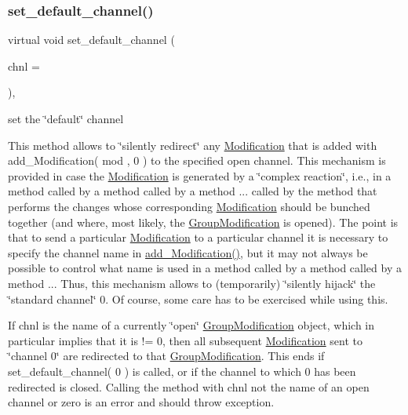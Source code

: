 \subsubsection{\texorpdfstring{set\+\_\+default\+\_\+channel()}{set\_default\_channel()}}
{\footnotesize\ttfamily virtual void set\+\_\+default\+\_\+channel (\begin{DoxyParamCaption}\item[{\mbox{\hyperlink{class_s_m_spp__di__unipi__it_1_1_observer_aa9ad8de42ffaf90023bfed5c085ad8bc}{c\+\_\+\+Chnl\+Name}}}]{chnl = {} }\end{DoxyParamCaption})\hspace{0.3cm}{\ttfamily [override]}, {\ttfamily [virtual]}}



set the \char`\"{}default\char`\"{} channel 

This method allows to \char`\"{}silently redirect\char`\"{} any \mbox{\hyperlink{class_s_m_spp__di__unipi__it_1_1_modification}{Modification}} that is added with add\+\_\+\+Modification( mod , 0 ) to the specified open channel. This mechanism is provided in case the \mbox{\hyperlink{class_s_m_spp__di__unipi__it_1_1_modification}{Modification}} is generated by a \char`\"{}complex reaction\char`\"{}, i.\+e., in a method called by a method called by a method ... called by the method that performs the changes whose corresponding \mbox{\hyperlink{class_s_m_spp__di__unipi__it_1_1_modification}{Modification}} should be bunched together (and where, most likely, the \mbox{\hyperlink{class_s_m_spp__di__unipi__it_1_1_group_modification}{Group\+Modification}} is opened). The point is that to send a particular \mbox{\hyperlink{class_s_m_spp__di__unipi__it_1_1_modification}{Modification}} to a particular channel it is necessary to specify the channel name in \mbox{\hyperlink{class_s_m_spp__di__unipi__it_1_1_block_a9b94536a10555dfb680e015fcb4787a8}{add\+\_\+\+Modification()}}, but it may not always be possible to control what name is used in a method called by a method called by a method ... Thus, this mechanism allows to (temporarily) \char`\"{}silently hijack\char`\"{} the \char`\"{}standard channel\char`\"{} 0. Of course, some care has to be exercised while using this.

If chnl is the name of a currently \char`\"{}open\char`\"{} \mbox{\hyperlink{class_s_m_spp__di__unipi__it_1_1_group_modification}{Group\+Modification}} object, which in particular implies that it is != 0, then all subsequent \mbox{\hyperlink{class_s_m_spp__di__unipi__it_1_1_modification}{Modification}} sent to \char`\"{}channel 0\char`\"{} are redirected to that \mbox{\hyperlink{class_s_m_spp__di__unipi__it_1_1_group_modification}{Group\+Modification}}. This ends if set\+\_\+default\+\_\+channel( 0 ) is called, or if the channel to which 0 has been redirected is closed. Calling the method with chnl not the name of an open channel or zero is an error and should throw exception. 

